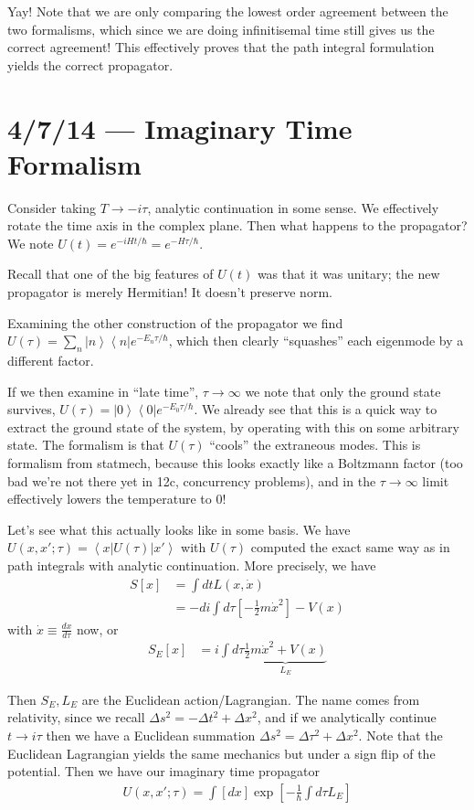 \documentclass[10pt]{report}
\newcommand{\bra}[1]{\left<#1\right|}
\newcommand{\ket}[1]{\left|#1\right>}
\newcommand{\rd}[2]{\frac{d#1}{d#2}}
\begin{document}
Yay! Note that we are only comparing the lowest order agreement between the two formalisms, which since we are doing infinitisemal time still gives us the correct agreement! This effectively proves that the path integral formulation yields the correct propagator.
\chapter{4/7/14 --- Imaginary Time Formalism}

Consider taking $T \to -i\tau$, analytic continuation in some sense. We effectively rotate the time axis in the complex plane. Then what happens to the propagator? We note $U(t) = e^{-iHt/\hbar} = e^{-H\tau/\hbar}$.

Recall that one of the big features of $U(t)$ was that it was unitary; the new propagator is merely Hermitian! It doesn't preserve norm.

Examining the other construction of the propagator we find $U(\tau) = \sum_{n}^{}\ket{n}\bra{n}e^{-E_n \tau/\hbar}$, which then clearly ``squashes'' each eigenmode by a different factor. 

If we then examine in ``late time'', $\tau \to \infty$ we note that only the ground state survives, $U(\tau) = \ket{0}\bra{0}e^{-E_0\tau/\hbar}$. We already see that this is a quick way to extract the ground state of the system, by operating with this on some arbitrary state. The formalism is that $U(\tau)$ ``cools'' the extraneous modes. This is formalism from statmech, because this looks exactly like a Boltzmann factor (too bad we're not there yet in 12c, concurrency problems), and in the $\tau \to \infty$ limit effectively lowers the temperature to $0$!

Let's see what this actually looks like in some basis. We have $U(x,x'; \tau) = \bra{x}U(\tau)\ket{x'}$ with $U(\tau)$ computed the exact same way as in path integrals with analytic continuation. More precisely, we have
\begin{align}
    S[x] &= \int dt L(x,\dot{x})\\
    &= -di\int d\tau\left[ -\frac{1}{2}m\dot{x}^2 \right]-V(x)
\end{align}
with $\dot{x} \equiv \rd{x}{\tau}$ now, or
\begin{align}
    S_E[x] &= i\int d\tau \underbrace{\frac{1}{2}m\dot{x}^2 + V(x)}_{L_E}
\end{align}

Then $S_E, L_E$ are the Euclidean action/Lagrangian. The name comes from relativity, since we recall $\Delta s^2 = -\Delta t^2 + \Delta x^2$, and if we analytically continue $t \to i\tau$ then we have a Euclidean summation $\Delta s^2 = \Delta \tau^2 + \Delta x^2$. Note that the Euclidean Lagrangian yields the same mechanics but under a sign flip of the potential. Then we have our imaginary time propagator
\begin{align}
    U(x,x'; \tau) = \int [dx] \exp\left[ -\frac{1}{\hbar}\int d\tau L_E \right]
\end{align}
\end{document}
